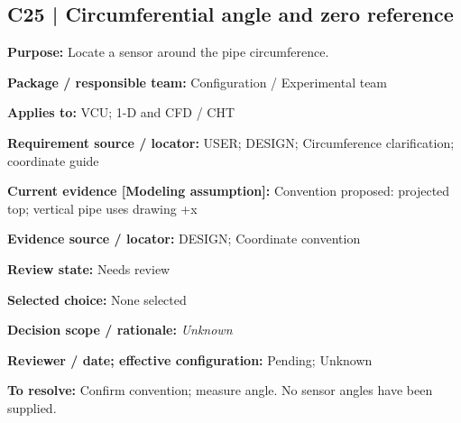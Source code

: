 \documentclass[11pt]{article}
\begin{document}
\par\noindent\begin{minipage}{\textwidth}\small\setlength{\parskip}{2pt}
\subsection*{C25 | Circumferential angle and zero reference}
\textbf{Purpose:} Locate a sensor around the pipe circumference.\par
\textbf{Package / responsible team:} Configuration / Experimental team\par
\textbf{Applies to:} VCU; 1-D and CFD / CHT\par
\textbf{Requirement source / locator:} USER; DESIGN; Circumference clarification; coordinate guide\par
\textbf{Current evidence [Modeling assumption]:} Convention proposed: projected top; vertical pipe uses drawing +x\par
\textbf{Evidence source / locator:} DESIGN; Coordinate convention\par
\textbf{Review state:} Needs review\par
\textbf{Selected choice:} None selected\par
\textbf{Decision scope / rationale:} \textit{Unknown}\par
\textbf{Reviewer / date; effective configuration:} Pending; Unknown\par
\textbf{To resolve:} Confirm convention; measure angle. No sensor angles have been supplied.\par
\end{minipage}\par\vspace{5pt}
\end{document}
